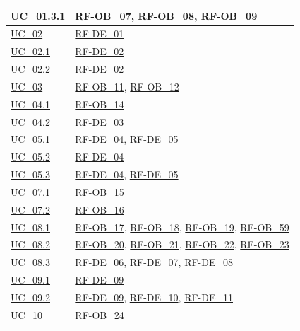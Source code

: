 \begin{longtable}{|>{\raggedright}p{}|>{\raggedright\arraybackslash}p{}|}
    \hline
    \hyperref[uc_01.3.1]{UC\_01.3.1} & \hyperlink{rf-ob_7}{RF-OB\_07}, \hyperlink{rf-ob_8}{RF-OB\_08}, \hyperlink{rf-ob_9}{RF-OB\_09} \\
    \hline
    \hyperref[uc_02]{UC\_02} & \hyperlink{rf-de_1}{RF-DE\_01} \\
    \hline
    \hyperref[uc_02.1]{UC\_02.1} & \hyperlink{rf-de_2}{RF-DE\_02} \\
    \hline
    \hyperref[uc_02.2]{UC\_02.2} & \hyperlink{rf-de_2}{RF-DE\_02} \\
    \hline
    \hyperref[uc_03]{UC\_03} & \hyperlink{rf-ob_11}{RF-OB\_11}, \hyperlink{rf-ob_12}{RF-OB\_12} \\
    \hline
    \hyperref[uc_04.1]{UC\_04.1} & \hyperlink{rf-ob_14}{RF-OB\_14} \\
    \hline
    \hyperref[uc_04.2]{UC\_04.2} & \hyperlink{rf-de_3}{RF-DE\_03} \\
    \hline
    \hyperref[uc_05.1]{UC\_05.1} & \hyperlink{rf-de_4}{RF-DE\_04}, \hyperlink{rf-de_5}{RF-DE\_05} \\
    \hline
    \hyperref[uc_05.2]{UC\_05.2} & \hyperlink{rf-de_4}{RF-DE\_04} \\
    \hline
    \hyperref[uc_05.3]{UC\_05.3} & \hyperlink{rf-de_4}{RF-DE\_04}, \hyperlink{rf-de_5}{RF-DE\_05} \\
    \hline
    \hyperref[uc_07.1]{UC\_07.1} & \hyperlink{rf-ob_15}{RF-OB\_15} \\
    \hline
    \hyperref[uc_07.2]{UC\_07.2} & \hyperlink{rf-ob_16}{RF-OB\_16} \\
    \hline
    \hyperref[uc_08.1]{UC\_08.1} & \hyperlink{rf-ob_17}{RF-OB\_17}, \hyperlink{rf-ob_18}{RF-OB\_18}, \hyperlink{rf-ob_19}{RF-OB\_19}, \hyperlink{rf-ob_59}{RF-OB\_59} \\
    \hline
    \hyperref[uc_08.2]{UC\_08.2} & \hyperlink{rf-ob_20}{RF-OB\_20}, \hyperlink{rf-ob_21}{RF-OB\_21}, \hyperlink{rf-ob_22}{RF-OB\_22}, \hyperlink{rf-ob_23}{RF-OB\_23} \\
    \hline
    \hyperref[uc_08.3]{UC\_08.3} & \hyperlink{rf-de_6}{RF-DE\_06}, \hyperlink{rf-de_7}{RF-DE\_07}, \hyperlink{rf-de_8}{RF-DE\_08} \\
    \hline
    \hyperref[uc_09.1]{UC\_09.1} & \hyperlink{rf-de_9}{RF-DE\_09} \\
    \hline
    \hyperref[uc_09.2]{UC\_09.2} & \hyperlink{rf-de_9}{RF-DE\_09}, \hyperlink{rf-de_10}{RF-DE\_10}, \hyperlink{rf-de_11}{RF-DE\_11} \\
    \hline
    \hyperref[uc_10]{UC\_10} & \hyperlink{rf-ob_24}{RF-OB\_24} \\

\end{longtable}
